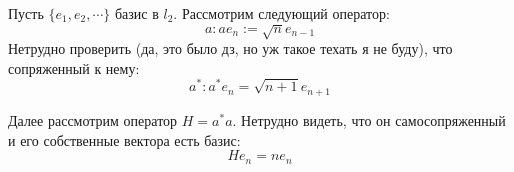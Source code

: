 \documentclass[12pt,a4paper]{article} %
\begin{document}
	Пусть $\{e_1,e_2,\cdots\}$ базис в $l_2$. Рассмотрим следующий оператор:
	$$a:a e_n:=\sqrt{n}e_{n-1}$$
	Нетрудно проверить (да, это было дз, но уж такое техать я не буду), что сопряженный к нему:
	$$a^*:a^*e_n=\sqrt{n+1}e_{n+1}$$
	
	Далее рассмотрим оператор $H=a^*a$. Нетрудно видеть, что он самосопряженный и его собственные вектора есть базис:
	$$He_n=ne_n$$
\end{document}

